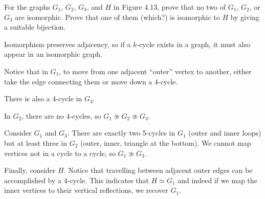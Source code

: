 \documentclass[class=math239,notes,tikz]{agony}
\begin{document}
\begin{xca}
  For the graphs $G_1$, $G_2$, $G_3$, and $H$ in Figure 4.13,
  prove that no two of $G_1$, $G_2$, or $G_3$ are isomorphic.
  Prove that one of them (which?) is isomorphic to $H$ by giving a suitable bijection.
\end{xca}
\begin{sol}
  Isomorphism preserves adjacency, so if a $k$-cycle exists in a graph,
  it must also appear in an isomorphic graph.

  Notice that in $G_1$, to move from one adjacent ``outer'' vertex to another,
  either take the edge connecting them or move down a 4-cycle.

  There is also a 4-cycle in $G_3$.

  In $G_2$, there are no 4-cycles, so $G_1 \not\simeq G_2 \not\simeq G_3$.

  Consider $G_1$ and $G_3$.
  There are exactly two 5-cycles in $G_1$ (outer and inner loops)
  but at least three in $G_2$ (outer, inner, triangle at the bottom).
  We cannot map vertices not in a cycle to a cycle, so $G_1 \not\simeq G_3$.

  Finally, consider $H$.
  Notice that travelling between adjacent outer edges can be accomplished by a 4-cycle.
  This indicates that $H \simeq G_1$ and indeed if we map the inner vertices
  to their vertical reflections, we recover $G_1$.
\end{sol}
\end{document}
